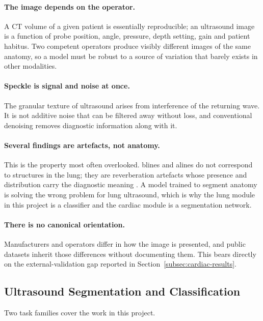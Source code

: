 \paragraph{The image depends on the operator.} A CT volume of a given patient is
essentially reproducible; an ultrasound image is a function of probe position, angle,
pressure, depth setting, gain and patient habitus. Two competent operators produce visibly
different images of the same anatomy, so a model must be robust to a source of variation
that barely exists in other modalities.

\paragraph{Speckle is signal and noise at once.} The granular texture of ultrasound arises
from interference of the returning wave. It is not additive noise that can be filtered away
without loss, and conventional denoising removes diagnostic information along with it.

\paragraph{Several findings are artefacts, not anatomy.} This is the property most often
overlooked. \gls{blines} and \gls{alines} do not correspond to structures in the lung; they
are reverberation artefacts whose presence and distribution carry the diagnostic meaning
\cite{lichtenstein2008blue}. A model trained to segment anatomy is solving the wrong problem
for lung ultrasound, which is why the lung module in this project is a classifier and the
cardiac module is a segmentation network.

\paragraph{There is no canonical orientation.} Manufacturers and operators differ in how the
image is presented, and public datasets inherit those differences without documenting them.
This bears directly on the external-validation gap reported in
Section~\ref{subsec:cardiac-results}.

\subsection{Ultrasound Segmentation and Classification}
\label{subsec:sota-seg-cls}

Two task families cover the work in this project.

